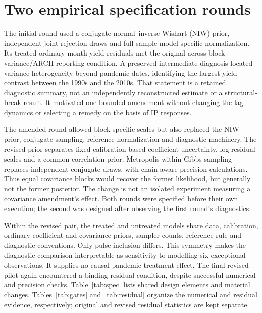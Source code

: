 \documentclass[11pt,a4paper]{article}
\begin{document}
\section{Two empirical specification rounds}
The initial round used a conjugate normal--inverse-Wishart (NIW) prior, independent joint-rejection draws and full-sample model-specific normalization. Its treated ordinary-month yield residuals met the original across-block variance/ARCH reporting condition. A preserved intermediate diagnosis located variance heterogeneity beyond pandemic dates, identifying the largest yield contrast between the 1990s and the 2010s. That statement is a retained diagnostic summary, not an independently reconstructed estimate or a structural-break result. It motivated one bounded amendment without changing the lag dynamics or selecting a remedy on the basis of IP responses.

The amended round allowed block-specific scales but also replaced the NIW prior, conjugate sampling, reference normalization and diagnostic machinery. The revised prior separates fixed calibration-based coefficient uncertainty, log residual scales and a common correlation prior. Metropolis-within-Gibbs sampling replaces independent conjugate draws, with chain-aware precision calculations. Thus equal covariance blocks would recover the former likelihood, but generally not the former posterior. The change is not an isolated experiment measuring a covariance amendment's effect. Both rounds were specified before their own execution; the second was designed after observing the first round's diagnostics.

Within the revised pair, the treated and untreated models share data, calibration, ordinary-coefficient and covariance priors, sampler counts, reference rule and diagnostic conventions. Only pulse inclusion differs. This symmetry makes the diagnostic comparison interpretable as sensitivity to modelling six exceptional observations. It supplies no causal pandemic-treatment effect. The final revised pilot again encountered a binding residual condition, despite successful numerical and precision checks. Table~\ref{tab:spec} lists shared design elements and material changes. Tables~\ref{tab:gates} and~\ref{tab:residual} organize the numerical and residual evidence, respectively; original and revised residual statistics are kept separate.
\end{document}
